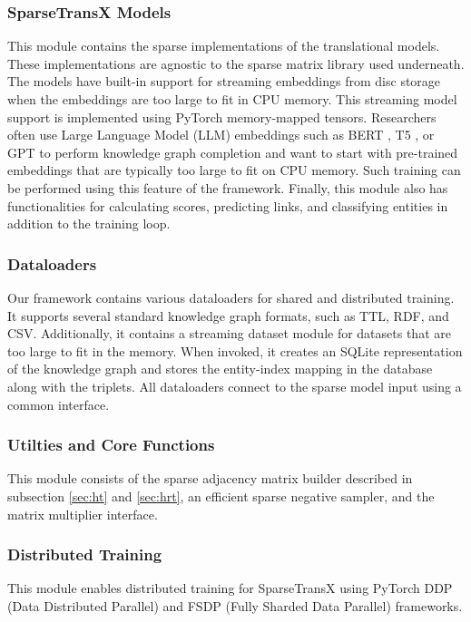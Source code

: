 \subsubsection{SparseTransX Models}
This module contains the sparse implementations of the translational models. These implementations are agnostic to the sparse matrix library used underneath. The models have built-in support for streaming embeddings from disc storage when the embeddings are too large to fit in CPU memory. This streaming model support is implemented using PyTorch memory-mapped tensors. Researchers often use Large Language Model (LLM) embeddings such as BERT \cite{devlin-etal-2019-bert}, T5 \cite{colin2020exploring}, or GPT \cite{radford2018improving} to perform knowledge graph completion \cite{wang2022simkgc, kim2020multi} and want to start with pre-trained embeddings that are typically too large to fit on CPU memory. Such training can be performed using this feature of the framework. Finally, this module also has functionalities for calculating scores, predicting links, and classifying entities in addition to the training loop.

\subsubsection{Dataloaders}
Our framework contains various dataloaders for shared and distributed training. It supports several standard knowledge graph formats, such as TTL, RDF, and CSV. Additionally, it contains a streaming dataset module for datasets that are too large to fit in the memory. When invoked, it creates an SQLite representation of the knowledge graph and stores the entity-index mapping in the database along with the triplets. All dataloaders connect to the sparse model input using a common interface.

\subsubsection{Utilties and Core Functions}
This module consists of the sparse adjacency matrix builder described in subsection \ref{sec:ht} and \ref{sec:hrt}, an efficient sparse negative sampler, and the matrix multiplier interface.

\subsubsection{Distributed Training}
This module enables distributed training for SparseTransX using PyTorch DDP (Data Distributed Parallel) and FSDP (Fully Sharded Data Parallel) frameworks.

